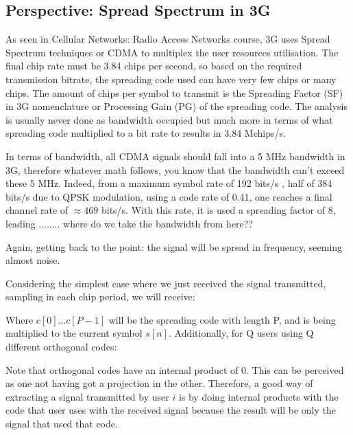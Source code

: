 \documentclass[12pt, a4paper]{article}
\begin{document}
    \subsection{Perspective: Spread Spectrum in 3G}
    \par As seen in Cellular Networks: Radio Access Networks course, 3G uses Spread Spectrum techniques or CDMA to multiplex the user resources utilisation. The final chip rate must be 3.84 chips per second, so based on the required transmission bitrate, the spreading code used can have very few chips or many chips. The amount of chips per symbol to transmit is the Spreading Factor (SF) in 3G nomenclature or Processing Gain (PG) of the spreading code. The analysis is usually never done as bandwidth occupied but much more in terms of what spreading code multiplied to a bit rate to results in 3.84 Mchips/s. 
    \par In terms of bandwidth, all CDMA signals should fall into a 5 MHz bandwidth in 3G, therefore whatever math follows, you know that the bandwidth can't exceed these 5 MHz. Indeed, from a maximum symbol rate of 192 bits/s , half of 384 bits/s due to QPSK modulation, using a code rate of 0.41, one reaches a final channel rate of $\approx 469$ bits/s. With this rate, it is used a spreading factor of 8, leading ........ where do we take the bandwidth from here??

    \Vhrulefill
\par Again, getting back to the point: the signal will be spread in frequency, seeming almost noise.


\vspace{.5cm}
\par Considering the simplest case where we just received the signal transmitted, sampling in each chip period, we will receive:


Where $c[0]... c[P-1]$ will be the spreading code with length P, and is being multiplied to the current symbol $s[n]$. Additionally, for Q users using Q different orthogonal codes: 


Note that orthogonal codes have an internal product of 0. This can be perceived as one not having got a projection in the other. Therefore, a good way of extracting a signal transmitted by user $i$ is by doing internal products with the code that user uses with the received signal because the result will be only the signal that used that code.
\end{document}
